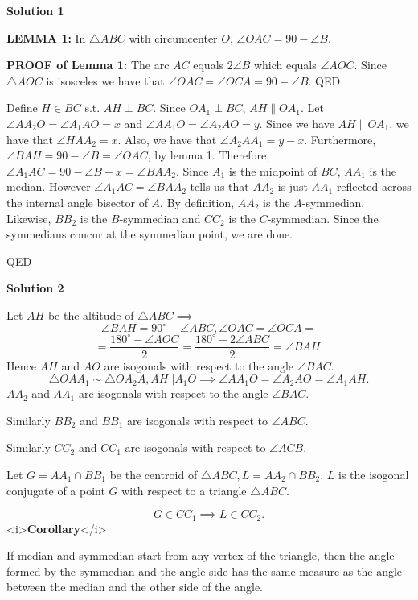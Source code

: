 \begin{enumerate}
 



\textbf{Solution 1}

\textbf{LEMMA 1: } In $\triangle ABC$ with circumcenter $O$, $\angle OAC = 90 - \angle B$. 

 \textbf{PROOF of Lemma 1:} The arc $AC$ equals $2\angle B$ which equals $\angle AOC$.  Since $\triangle AOC$ is isosceles we have that $\angle OAC = \angle OCA = 90 - \angle B$. QED

 Define $H \in BC$ s.t. $AH \perp BC$.  Since $OA_1 \perp BC$, $AH \parallel OA_1$.  Let $\angle AA_2O = \angle A_1AO = x$ and $\angle AA_1O = \angle A_2AO = y$.  Since we have $AH \parallel OA_1$, we have that $\angle HAA_2 = x$.  Also, we have that $\angle A_2AA_1 = y-x$.  Furthermore, $\angle BAH = 90 - \angle B = \angle OAC$, by lemma 1.  Therefore, $\angle A_1AC = 90 - \angle B + x = \angle BAA_2$.  Since $A_1$ is the midpoint of $BC$, $AA_1$ is the median.  However $\angle A_1AC =  \angle BAA_2$ tells us that $AA_2$ is just $AA_1$ reflected across the internal angle bisector of $A$.  By definition, $AA_2$ is the $A$-symmedian.  Likewise, $BB_2$ is the $B$-symmedian and $CC_2$ is the $C$-symmedian.  Since the symmedians concur at the symmedian point, we are done.

 QED

 



\textbf{Solution 2}

Let $AH$ be the altitude of $\triangle ABC \implies$
 \[\angle BAH = 90^\circ - \angle ABC, \angle OAC  = \angle OCA =\]
 \[=  \frac{180^\circ - \angle AOC}{2} = \frac{180^\circ - 2\angle ABC}{2} = \angle BAH.\]Hence $AH$ and $AO$ are isogonals with respect to the angle $\angle BAC.$
 \[\triangle OAA_1 \sim \triangle OA_2A, AH || A_1O \implies \angle AA_1O = \angle A_2AO = \angle A_1AH.\]$AA_2$ and $AA_1$ are isogonals with respect to the angle $\angle BAC.$

 Similarly $BB_2$ and $BB_1$ are isogonals with respect to $\angle ABC.$

 Similarly $CC_2$ and $CC_1$ are isogonals with respect to $\angle ACB.$

 Let $G = AA_1 \cap BB_1$ be the centroid of $\triangle ABC, L = AA_2 \cap BB_2.$
$L$ is the isogonal conjugate of a point $G$ with respect to a triangle $\triangle ABC.$

 \[G \in CC_1 \implies L \in CC_2.\]
<i>\textbf{Corollary}</i>

 If median and symmedian start from any vertex of the triangle, then the angle formed by the symmedian and the angle side has the same measure as the angle between the median and the other side of the angle.


\end{enumerate}
